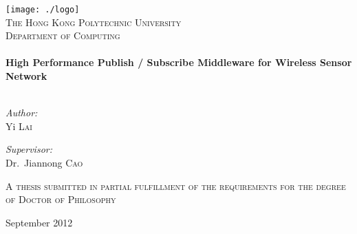 \begin{titlepage}
\begin{center}

\texttt{[image: ./logo]}\\[1cm]    

\textsc{\LARGE The Hong Kong Polytechnic University}\\[0.5cm]

\textsc{\Large Department of Computing}\\[0.5cm]

\HRule \\[0.4cm]
{ \LARGE \bfseries High Performance Publish / Subscribe Middleware for Wireless Sensor Network}\\[0.4cm]

\HRule \\[1cm]

\begin{minipage}{0.4\textwidth}
\begin{flushleft} \large
\emph{Author:}\\
Yi \textsc{Lai}
\end{flushleft}
\end{minipage}
\begin{minipage}{0.4\textwidth}
\begin{flushright} \large
\emph{Supervisor:} \\
Dr.~Jiannong \textsc{Cao}
\end{flushright}
\end{minipage}

\vspace{2cm}
\textsc{\large A thesis submitted in partial fulfillment of the requirements for the degree of Doctor of Philosophy} 

\vfill

{\large September 2012}

\end{center}

\end{titlepage}
